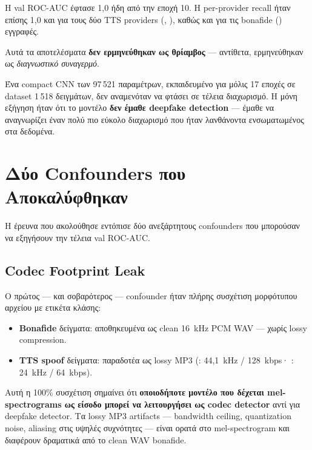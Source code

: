 Η val ROC-AUC έφτασε 1{,}0 ήδη από την εποχή 10.
Η per-provider recall ήταν επίσης 1{,}0 και για τους δύο TTS providers
(, ), καθώς και για τις
bonafide () εγγραφές.

Αυτά τα αποτελέσματα \textbf{δεν ερμηνεύθηκαν ως θρίαμβος} —
αντίθετα, ερμηνεύθηκαν ως \emph{διαγνωστικό συναγερμό}.

Ένα compact CNN των 97\,521 παραμέτρων, εκπαιδευμένο για μόλις 17 εποχές
σε dataset 1\,518 δειγμάτων, δεν αναμενόταν να φτάσει σε τέλεια διαχωρισμό.
Η μόνη εξήγηση ήταν ότι το μοντέλο \textbf{δεν έμαθε deepfake detection} —
έμαθε να αναγνωρίζει έναν πολύ πιο εύκολο διαχωρισμό που ήταν
λανθάνοντα ενσωματωμένος στα δεδομένα.

\section{Δύο Confounders που Αποκαλύφθηκαν}
\label{sec:confounders}

Η έρευνα που ακολούθησε εντόπισε δύο ανεξάρτητους confounders
που μπορούσαν να εξηγήσουν την τέλεια val ROC-AUC.

\subsection{Codec Footprint Leak}
\label{subsec:codec-leak}

Ο πρώτος — και σοβαρότερος — confounder ήταν πλήρης συσχέτιση
μορφότυπου αρχείου με ετικέτα κλάσης:

\begin{itemize}
  \item \textbf{Bonafide} δείγματα: αποθηκευμένα ως clean 16~kHz PCM WAV —
        χωρίς lossy compression.
  \item \textbf{TTS spoof} δείγματα: παραδοτέα ως lossy MP3
        (: 44{,}1~kHz / 128~kbps·
         : 24~kHz / 64~kbps).
\end{itemize}

Αυτή η 100\% συσχέτιση  σημαίνει ότι
\textbf{οποιοδήποτε μοντέλο που δέχεται mel-spectrograms ως είσοδο
μπορεί να λειτουργήσει ως codec detector} αντί για deepfake detector.
Τα lossy MP3 artifacts — bandwidth ceiling, quantization noise,
aliasing στις υψηλές συχνότητες — είναι ορατά στο mel-spectrogram και
διαφέρουν δραματικά από το clean WAV bonafide.

